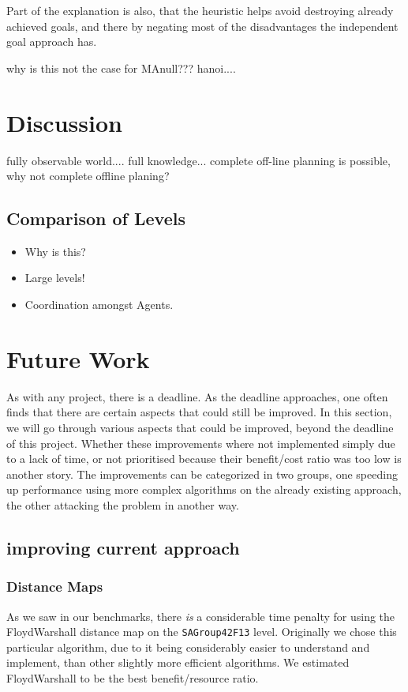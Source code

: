 \documentclass[letterpaper]{article}
\begin{document}
		Part of the explanation is also, that the heuristic helps avoid destroying already achieved goals, and there by negating most of the disadvantages the independent goal approach has. 
		
		why is this not the case for MAnull???
		hanoi....
	
	
\section{Discussion}
	\label{disscussion}
	fully observable world.... full knowledge... complete off-line planning is possible, why not complete offline planing?
	\subsection{Comparison of Levels}
	\begin{itemize}
		\item{Why is this?}
		\item{Large levels!}
		\item{Coordination amongst Agents.}
	\end{itemize}


\section{Future Work}
	As with any project, there is a deadline. As the deadline approaches, one often finds that there are certain aspects that could still be improved. In this section, we will go through various aspects that could be improved, beyond the deadline of this project. Whether these improvements where not implemented simply due to a lack of time, or not prioritised because their benefit/cost ratio was too low is another story. The improvements can be categorized in two groups, one speeding up performance using more complex algorithms on the already existing approach, the other attacking the problem in another way.
	
	\subsection{improving current approach} 

	\subsubsection{Distance Maps}
		As we saw in our benchmarks, there \emph{is} a considerable time penalty for using the FloydWarshall distance map on the \verb=SAGroup42F13= level. Originally we chose this particular algorithm, due to it being considerably easier to understand and implement, than other slightly more efficient algorithms. We estimated FloydWarshall to be the best benefit/resource ratio.
\end{document}
